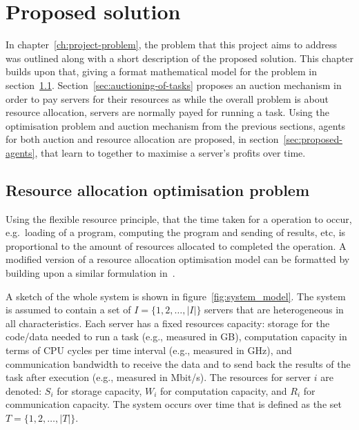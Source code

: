\chapter{Proposed solution}\label{ch:proposed-solution}
In chapter~\ref{ch:project-problem}, the problem that this project aims to address was outlined along with a short
description of the proposed solution. This chapter builds upon that, giving a format mathematical model for the problem
in section~\ref{sec:optimisation-problem}. Section~\ref{sec:auctioning-of-tasks} proposes an auction mechanism in order
to pay servers for their resources as while the overall problem is about resource allocation, servers are normally
payed for running a task. Using the optimisation problem and auction mechanism from the previous sections,
agents for both auction and resource allocation are proposed, in section~\ref{sec:proposed-agents}, that learn to
together to maximise a server's profits over time.

\section{Resource allocation optimisation problem}\label{sec:optimisation-problem}
Using the flexible resource principle, that the time taken for a operation to
occur, e.g.\ loading of a program, computing the program and sending of results, etc, is proportional to the amount of
resources allocated to completed the operation. A modified version of a resource allocation optimisation model can be
formatted by building upon a similar formulation in~\cite{FlexibleResourceAllocation}.

A sketch of the whole system is shown in figure~\ref{fig:system_model}.
The system is assumed to contain a set of $I = \{1,2,\ldots,\left|I\right|\}$ servers that are heterogeneous in all
characteristics. Each server has a fixed resources capacity: storage for the code/data needed to run a task
(e.g., measured in GB), computation capacity in terms of CPU cycles per time interval (e.g., measured in GHz),
and communication bandwidth to receive the data and to send back the results of the task after execution
(e.g., measured in Mbit/s). The resources for server $i$ are denoted: $S_i$ for storage capacity, $W_i$ for computation
capacity, and $R_i$ for communication capacity. The system occurs over time that is defined as the set
$T = \{1,2,\ldots,\left|T\right|\}$.

